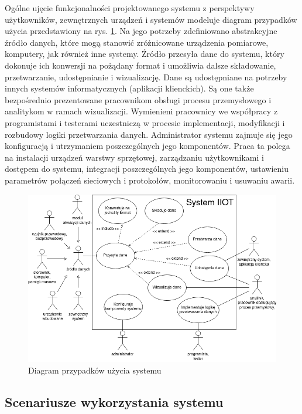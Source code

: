 \documentclass[a4paper, 12pt, twoside]{article}
\begin{document}
Ogólne ujęcie funkcjonalności projektowanego systemu z perspektywy użytkowników,
zewnętrznych urządzeń i systemów modeluje diagram przypadków użycia przedstawiony
na rys. \ref{fig:use-case}. Na jego potrzeby zdefiniowano abstrakcyjne
źródło danych, które mogą stanowić zróżnicowane urządzenia pomiarowe, komputery,
jak również inne systemy. Źródło przesyła
dane do systemu, który dokonuje ich konwersji na pożądany format i umożliwia
dalsze składowanie, przetwarzanie, udostępnianie i wizualizację. Dane są
udostępniane na potrzeby innych systemów informatycznych (aplikacji klienckich).
Są one także bezpośrednio prezentowane pracownikom obsługi procesu przemysłowego
i analitykom w ramach wizualizacji. Wymienieni pracownicy we
współpracy z programistami i testerami uczestniczą
w procesie implementacji, modyfikacji i rozbudowy logiki przetwarzania danych.
Administrator systemu zajmuje się jego konfiguracją i utrzymaniem
poszczególnych jego komponentów. Praca ta polega na
instalacji urządzeń warstwy sprzętowej, zarządzaniu
użytkownikami i dostępem do systemu, integracji poszczególnych jego komponentów,
ustawieniu parametrów połączeń sieciowych i protokołów, monitorowaniu
i usuwaniu awarii.

\begin{figure}
      \centering
      \includegraphics[width=\textwidth]{use-case.png}
      \caption{Diagram przypadków użycia systemu}
      \label{fig:use-case}
\end{figure}

\subsection{Scenariusze wykorzystania systemu}\label{scenariusze}
\end{document}
